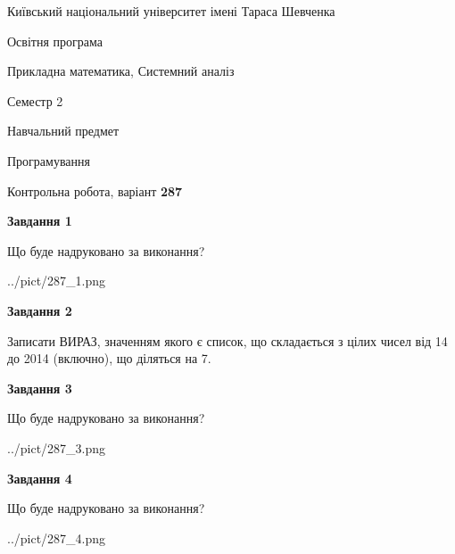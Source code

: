 \documentclass[12pt, ukrainian]{article}
\begin{document}
{{\begin {small}\par
{ \center  Київський національний університет імені Тараса Шевченка \par}
{\parbox {5 cm}{Освітня програма \hfill}{\parbox {8 cm}{Прикладна математика, Системний аналіз \hfill}}\parbox {5 cm}{\hfill Семестр 2}}\par
{\parbox {5 cm} {Навчальний предмет \hfill}\parbox {7 cm}{Програмування \hfill}\parbox {6cm}{\hfill}\par}\vspace{-7pt} \end{small}}{\center Контрольна робота, варіант  \No \textbf
{ 287 }\par}}
{
\begin {large}
{\begin {center}\textbf{Завдання 1}\end {center}}\par
Що буде надруковано за виконання?\par\par
\begin{center}
	{../pict/287_1.png}
\end{center}
\newpage

{\begin {center}\textbf{Завдання 2}\end {center}}\par

Записати ВИРАЗ, значенням якого є список, що складається з цілих чисел від 14 до 2014 (включно), що діляться на 7.\par
\newpage

{\begin {center}\textbf{Завдання 3}\end {center}}\par
Що буде надруковано за виконання?
\begin{center}
	{../pict/287_3.png}
\end{center}
\newpage

{\begin {center}\textbf{Завдання 4}\end {center}}\par
Що буде надруковано за виконання?\par
\begin{center}
	{../pict/287_4.png}
\end{center}
\newpage


\end{large}}
\end{document}
